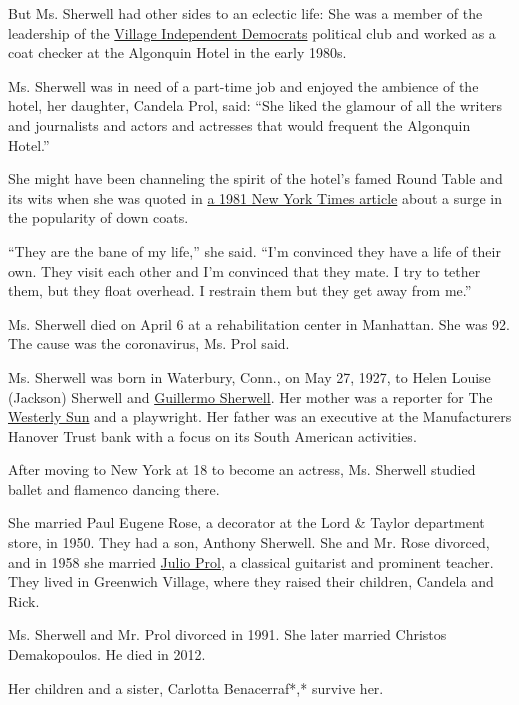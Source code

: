 But Ms. Sherwell had other sides to an eclectic life: She was a member
of the leadership of the
\href{https://villagedemocrats.org/55-years-strong/}{Village Independent
Democrats} political club and worked as a coat checker at the Algonquin
Hotel in the early 1980s.

Ms. Sherwell was in need of a part-time job and enjoyed the ambience of
the hotel, her daughter, Candela Prol, said: ``She liked the glamour of
all the writers and journalists and actors and actresses that would
frequent the Algonquin Hotel.''

She might have been channeling the spirit of the hotel's famed Round
Table and its wits when she was quoted in
\href{https://www.nytimes.com/1981/01/07/garden/a-problem-in-the-cloakroom-finding-space-for-down-coats.html}{a
1981 New York Times article} about a surge in the popularity of down
coats.

``They are the bane of my life,'' she said. ``I'm convinced they have a
life of their own. They visit each other and I'm convinced that they
mate. I try to tether them, but they float overhead. I restrain them but
they get away from me.''

Ms. Sherwell died on April 6 at a rehabilitation center in Manhattan.
She was 92. The cause was the coronavirus, Ms. Prol said.

Ms. Sherwell was born in Waterbury, Conn., on May 27, 1927, to Helen
Louise (Jackson) Sherwell and
\href{https://timesmachine.nytimes.com/timesmachine/1963/05/01/80445766.html?pageNumber=39}{Guillermo
Sherwell}. Her mother was a reporter for The
\href{https://www.thewesterlysun.com/}{Westerly Sun} and a playwright.
Her father was an executive at the Manufacturers Hanover Trust bank with
a focus on its South American activities.

After moving to New York at 18 to become an actress, Ms. Sherwell
studied ballet and flamenco dancing there.

She married Paul Eugene Rose, a decorator at the Lord \& Taylor
department store, in 1950. They had a son, Anthony Sherwell. She and Mr.
Rose divorced, and in 1958 she married
\href{https://www.nytimes.com/1999/06/25/classified/paid-notice-deaths-prol-julio.html}{Julio
Prol}, a classical guitarist and prominent teacher. They lived in
Greenwich Village, where they raised their children, Candela and Rick.

Ms. Sherwell and Mr. Prol divorced in 1991. She later married Christos
Demakopoulos. He died in 2012.

Her children and a sister, Carlotta Benacerraf*,* survive her.

